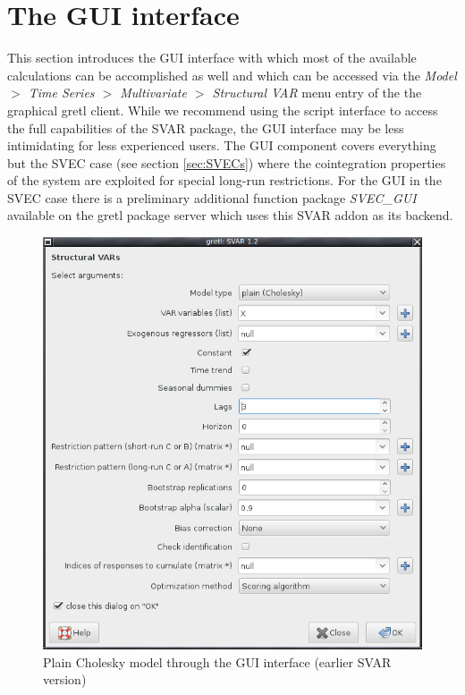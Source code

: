 \documentclass[a4paper,10pt]{article}
\newcommand{\app}[1]{\textsf{#1}}
\newcounter{script}[section]
\begin{document}



\appendix

\pagebreak

\section{The GUI interface}
\label{sec:GUI}

This section introduces the GUI interface with which most of the
available calculations can be accomplished as well and which can be
accessed via the \emph{Model $>$ Time Series $>$ Multivariate $>$ 
Structural VAR}
menu entry of the the graphical \app{gretl} client.  While we recommend
using the script interface to access the full capabilities of the SVAR
package, the GUI interface may be less intimidating for less
experienced users. The GUI component covers everything but the SVEC case 
(see section \ref{sec:SVECs}) where the cointegration properties of the 
system are exploited for special long-run restrictions. For the GUI in
the SVEC case there is a preliminary additional function package 
\emph{SVEC\_GUI} available on the gretl package server which uses this
SVAR addon as its backend. 

\begin{figure}[htbp]
  \centering
  \includegraphics[scale=0.5]{GUI_SVAR.png}
  \caption{Plain Cholesky model through the GUI interface (earlier SVAR version)}
  \label{fig:GUI-plain}
\end{figure}
\end{document}
